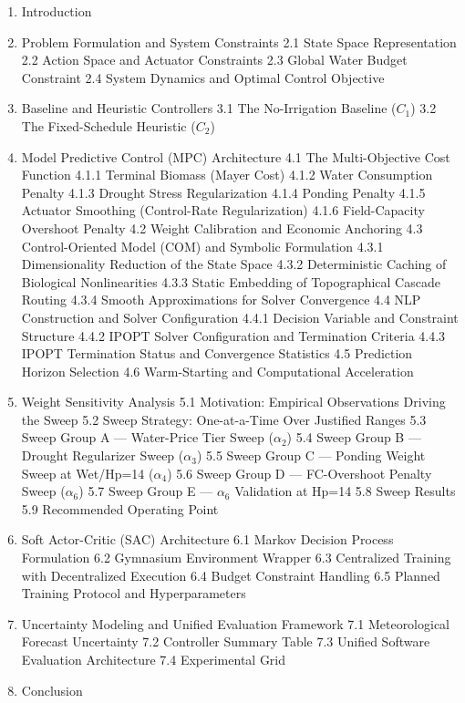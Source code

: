\begin{enumerate}
\def\labelenumi{\arabic{enumi}.}
\tightlist
\item
  Introduction
\item
  Problem Formulation and System Constraints 2.1 State Space
  Representation 2.2 Action Space and Actuator Constraints 2.3 Global
  Water Budget Constraint 2.4 System Dynamics and Optimal Control
  Objective
\item
  Baseline and Heuristic Controllers 3.1 The No-Irrigation Baseline
  (\(C_1\)) 3.2 The Fixed-Schedule Heuristic (\(C_2\))
\item
  Model Predictive Control (MPC) Architecture 4.1 The Multi-Objective
  Cost Function 4.1.1 Terminal Biomass (Mayer Cost) 4.1.2 Water
  Consumption Penalty 4.1.3 Drought Stress Regularization 4.1.4 Ponding
  Penalty 4.1.5 Actuator Smoothing (Control-Rate Regularization) 4.1.6
  Field-Capacity Overshoot Penalty 4.2 Weight Calibration and Economic
  Anchoring 4.3 Control-Oriented Model (COM) and Symbolic Formulation
  4.3.1 Dimensionality Reduction of the State Space 4.3.2 Deterministic
  Caching of Biological Nonlinearities 4.3.3 Static Embedding of
  Topographical Cascade Routing 4.3.4 Smooth Approximations for Solver
  Convergence 4.4 NLP Construction and Solver Configuration 4.4.1
  Decision Variable and Constraint Structure 4.4.2 IPOPT Solver
  Configuration and Termination Criteria 4.4.3 IPOPT Termination Status
  and Convergence Statistics 4.5 Prediction Horizon Selection 4.6
  Warm-Starting and Computational Acceleration
\item
  Weight Sensitivity Analysis 5.1 Motivation: Empirical Observations
  Driving the Sweep 5.2 Sweep Strategy: One-at-a-Time Over Justified
  Ranges 5.3 Sweep Group A --- Water-Price Tier Sweep (\(\alpha_2\)) 5.4
  Sweep Group B --- Drought Regularizer Sweep (\(\alpha_3\)) 5.5 Sweep
  Group C --- Ponding Weight Sweep at Wet/Hp=14 (\(\alpha_4\)) 5.6 Sweep
  Group D --- FC-Overshoot Penalty Sweep (\(\alpha_6\)) 5.7 Sweep Group
  E --- \(\alpha_6\) Validation at Hp=14 5.8 Sweep Results 5.9
  Recommended Operating Point
\item
  Soft Actor-Critic (SAC) Architecture 6.1 Markov Decision Process
  Formulation 6.2 Gymnasium Environment Wrapper 6.3 Centralized Training
  with Decentralized Execution 6.4 Budget Constraint Handling 6.5
  Planned Training Protocol and Hyperparameters
\item
  Uncertainty Modeling and Unified Evaluation Framework 7.1
  Meteorological Forecast Uncertainty 7.2 Controller Summary Table 7.3
  Unified Software Evaluation Architecture 7.4 Experimental Grid
\item
  Conclusion
\end{enumerate}

